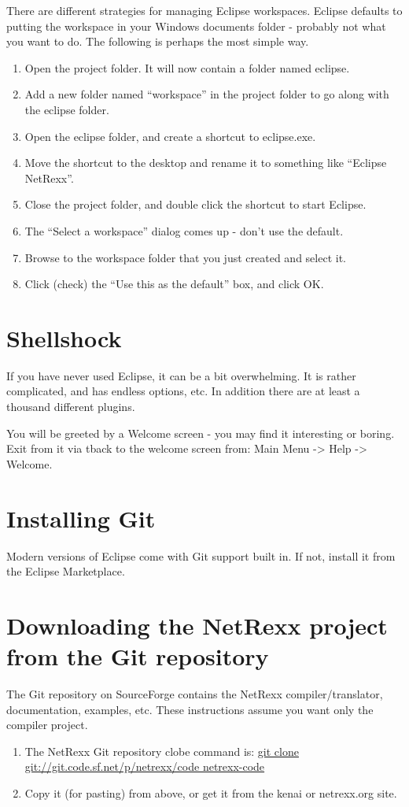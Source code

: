 There are different strategies for managing Eclipse workspaces.
Eclipse defaults to putting the workspace in your Windows documents
folder - probably not what you want to do.  The following is perhaps
the most simple way.
\begin{enumerate}
\item Open the project folder.  It will now contain a folder named
   eclipse.
\item Add a new folder named ``workspace'' in the project folder to go
along with the eclipse folder.
\item Open the eclipse folder, and create a shortcut to eclipse.exe.
\item Move the shortcut to the desktop and rename it to something like
   ``Eclipse NetRexx''.
\item Close the project folder, and double click the shortcut to start
   Eclipse.
\item The ``Select a workspace'' dialog comes up - don't use the default.
\item Browse to the workspace folder that you just created and select it.
\item Click (check) the ``Use this as the default'' box, and click OK.
\end{enumerate}
\section{Shellshock}
 
If you have never used Eclipse, it can be a bit overwhelming.  It is
rather complicated, and has endless options, etc.  In addition there
are at least a thousand different plugins.
 
You will be greeted by a Welcome screen - you may find it interesting
or boring.  Exit from it via tback to the welcome screen from: Main Menu -> Help -> Welcome.
 
\section{Installing Git}
 
Modern versions of Eclipse come with Git support built in. If not,
install it from the Eclipse Marketplace.

\section{Downloading the NetRexx project from the Git repository}
 
The Git repository on SourceForge contains the NetRexx compiler/translator,
documentation, examples, etc.  These instructions assume you want only
the compiler project.
\begin{enumerate}
\item The NetRexx Git repository clobe command is:
            \url{git clone git://git.code.sf.net/p/netrexx/code netrexx-code}
\item Copy it (for pasting) from above, or get it from the kenai or
            netrexx.org site.
\end{enumerate}


